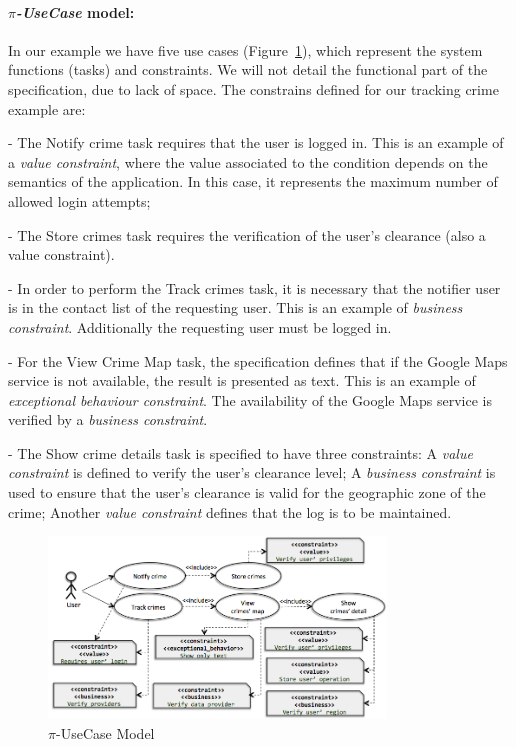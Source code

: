 \paragraph*{\textit{$\pi$-UseCase} model:} 
In our example we have five use cases (Figure~\ref{fig:piUC}), which represent the
system functions (tasks) and constraints. 
We will not detail the functional part of the specification, due to lack of space.
The constrains defined for our tracking crime example are: 
\begin{trivlist}
  \item[-] The \textsf{Notify crime} task requires that the user is logged in. 
  This is an example of a \textit{value constraint}, where the value associated to the condition depends on the semantics of the application.
  In this case, it represents the maximum number of allowed login attempts;
\item[-] The \textsf{Store crimes} task requires the verification of the user's clearance (also a value constraint). 
\item[-] In order to perform the \textsf{Track crimes} task, it is necessary that the notifier user is in the contact list of the requesting user.
This is an example of \textit{business constraint}.
Additionally the requesting user must be logged in.
\item[-]  For the \textsf{View Crime Map} task, the specification defines that if the Google Maps service is not available, the result is presented as text. This is an example of \textit{exceptional behaviour constraint}. 
The availability of the Google Maps service is verified by a \textit{business constraint}.
 \item[-] The \textsf{Show crime details} task is specified to have three constraints: A \textit{value constraint} is defined to verify the user's clearance level; A \textit{business constraint} is used to ensure that the user's clearance is valid for the geographic zone of the crime; Another \textit{value constraint} defines that the log is to be maintained.
\end{trivlist}
\begin{figure}[t]
\centering
\includegraphics[width=0.8\textwidth]{figs/piUseCase}
\caption{$\pi$-UseCase Model}
\label{fig:piUC}
\end{figure}
